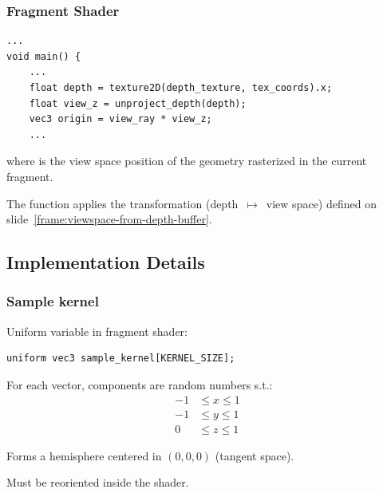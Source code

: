 \documentclass{beamer}
\newcommand{\redtext}[1]{\textcolor{myred}{#1}}
\begin{document}
\begin{frame}[fragile]
\frametitle{Fragment Shader}
\begin{verbatim}
...
void main() {
    ...
    float depth = texture2D(depth_texture, tex_coords).x;
    float view_z = unproject_depth(depth);
    vec3 origin = view_ray * view_z;
    ...
\end{verbatim}
where  is the view space position of the geometry rasterized in the current fragment.

The function  applies the transformation (\redtext{depth~$ \mapsto $~view space}) defined on slide~\redtext{\ref{frame:viewspace-from-depth-buffer}}.

\end{frame}

\subsection{Implementation Details}

\begin{frame}[fragile]
\frametitle{Sample kernel}
\redtext{Uniform variable} in fragment shader:
\begin{verbatim}
uniform vec3 sample_kernel[KERNEL_SIZE];
\end{verbatim}

For each vector, components are random numbers s.t.:
\begin{align*}
-1 & \le x \le 1 \\
-1 & \le y \le 1 \\
0 & \le z \le 1
\end{align*}

Forms a \redtext{hemisphere} centered in $ (0, 0, 0) $ (\redtext{tangent space}).

Must be \redtext{reoriented} inside the shader.
\end{frame}
\end{document}
